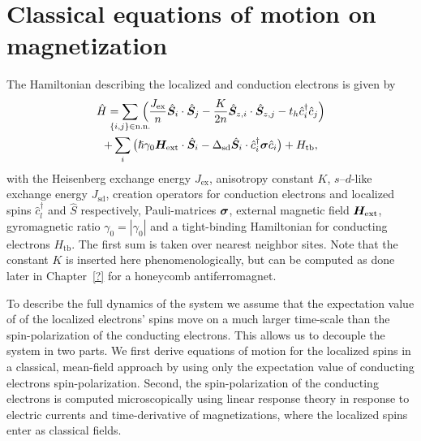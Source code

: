 \section{Classical equations of motion on magnetization}\label{cd:sd:motion}
The Hamiltonian describing the localized and conduction electrons is given by
\begin{multline}
    \hat{H}
        = \sum_{\mathclap{\{i,j\}\in\text{n.n.}}}\,\Big(\frac{J_{\text{ex}}}{n}\hat{\bb{S}}_i\cdot\hat{\bb{S}}_j - \frac{K}{2n}\hat{\bb{S}}_{z,i}\cdot\hat{\bb{S}}_{z,j}-t_h \hat{c}_i^\dagger\hat{c}_j
        \Big)\\+\sum_i \big(\hslash\gamma_0\bb{H}_\text{ext}\cdot\hat{\bb{S}}_i-\Delta_\text{sd}\hat{\bb{S}}_i\cdot\hat{c}_i^\dagger\bb{\sigma}\hat{c}_i\big)+H_\text{tb},
    \label{intro:eq:Hm}%
\end{multline}
with the Heisenberg exchange energy $J_{\text{ex}}$, anisotropy constant $K$, $s$--$d$-like exchange energy $J_{\text{sd}}$, creation operators for conduction electrons and localized spins $\hat{c}^\dagger_l$ and $\hat{S}$ respectively, Pauli-matrices $\boldsymbol{\sigma}$, external magnetic field $\boldsymbol{H}_\text{ext}$, gyromagnetic ratio $\gamma_0=|\gamma_0|$ and a tight-binding Hamiltonian for conducting electrons $H_\text{tb}$.  The first sum is taken over nearest neighbor sites. Note that the constant $K$ is inserted here phenomenologically, but can be computed as done later in Chapter~\ref{?} for a honeycomb antiferromagnet.

To describe the full dynamics of the system we assume that the expectation value of of the localized electrons' spins move on a much larger time-scale than the spin-polarization of the conducting electrons. This allows us to decouple the system in two parts. We first derive equations of motion for the localized spins in a classical, mean-field approach by using only the expectation value of conducting electrons spin-polarization. Second, the spin-polarization of the conducting electrons is computed microscopically using linear response theory in response to electric currents and time-derivative of magnetizations, where the localized spins enter as classical fields. 

